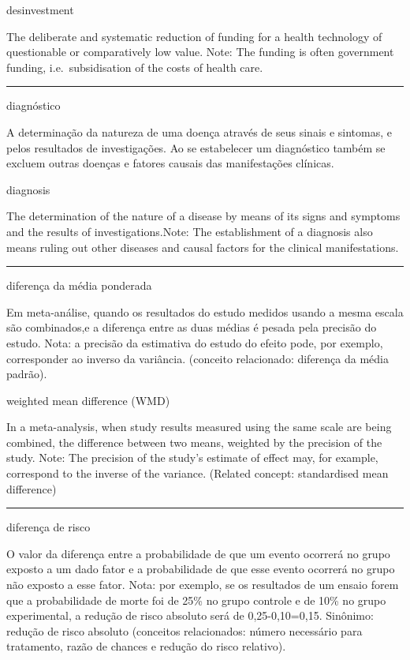 \documentclass[
  openany]{book}
\begin{document}
desinvestment

The deliberate and systematic reduction of funding for a health technology of questionable or comparatively low value. Note: The funding is often government funding, i.e.~subsidisation of the costs of health care.

\begin{center}\rule{0.5\linewidth}{0.5pt}\end{center}

diagnóstico

A determinação da natureza de uma doença através de seus sinais e sintomas, e pelos resultados de investigações. Ao se estabelecer um diagnóstico também se excluem outras doenças e fatores causais das manifestações clínicas.

diagnosis

The determination of the nature of a disease by means of its signs and symptoms and the results of investigations.Note: The establishment of a diagnosis also means ruling out other diseases and causal factors for the clinical manifestations.

\begin{center}\rule{0.5\linewidth}{0.5pt}\end{center}

diferença da média ponderada

Em meta-análise, quando os resultados do estudo medidos usando a mesma escala são combinados,e a diferença entre as duas médias é pesada pela precisão do estudo. Nota: a precisão da estimativa do estudo do efeito pode, por exemplo, corresponder ao inverso da variância. (conceito relacionado: diferença da média padrão).

weighted mean difference (WMD)

In a meta-analysis, when study results measured using the same scale are being combined, the difference between two means, weighted by the precision of the study. Note: The precision of the study's estimate of effect may, for example, correspond to the inverse of the variance. (Related concept: standardised mean difference)

\begin{center}\rule{0.5\linewidth}{0.5pt}\end{center}

diferença de risco

O valor da diferença entre a probabilidade de que um evento ocorrerá no grupo exposto a um dado fator e a probabilidade de que esse evento ocorrerá no grupo não exposto a esse fator. Nota: por exemplo, se os resultados de um ensaio forem que a probabilidade de morte foi de 25\% no grupo controle e de 10\% no grupo experimental, a redução de risco absoluto será de 0,25-0,10=0,15. Sinônimo: redução de risco absoluto (conceitos relacionados: número necessário para tratamento, razão de chances e redução do risco relativo).
\end{document}
